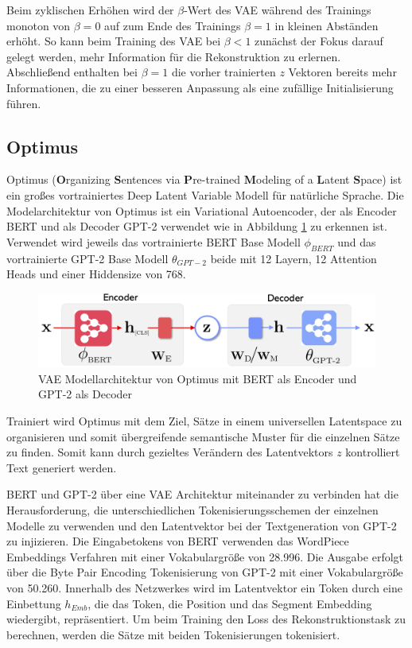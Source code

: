 Beim zyklischen Erhöhen wird der $\beta$-Wert des VAE während des Trainings monoton von $\beta=0$ auf zum Ende des Trainings $\beta=1$ in kleinen Abständen erhöht.
So kann beim Training des VAE bei $\beta<1$ zunächst der Fokus darauf gelegt werden, mehr Information für die Rekonstruktion zu erlernen. 
Abschließend enthalten bei $\beta=1$ die vorher trainierten $z$ Vektoren bereits mehr Informationen, die zu einer besseren Anpassung als eine zufällige Initialisierung führen.



\subsection{Optimus}
Optimus (\textbf{O}rganizing \textbf{S}entences via \textbf{P}re-trained \textbf{M}odeling of a \textbf{L}atent \textbf{S}pace) \citep{DBLP:journals/corr/abs-2004-04092} ist ein großes vortrainiertes Deep Latent Variable Modell für natürliche Sprache.
Die Modelarchitektur von Optimus ist ein Variational Autoencoder, der als Encoder BERT und als Decoder GPT-2 verwendet wie in Abbildung \ref{optimus_scheme_fig} zu erkennen ist. 
Verwendet wird jeweils das vortrainierte BERT Base Modell $\phi_{BERT}$ und das vortrainierte GPT-2 Base Modell $\theta_{GPT-2}$ beide mit 12 Layern, 12 Attention Heads und einer Hiddensize von 768. 
\begin{figure}[h]
    \centering
    \includegraphics[width=\textwidth]{bilder/optimus_scheme}
    \caption{VAE Modellarchitektur von Optimus mit BERT als Encoder und GPT-2 als Decoder \citep{DBLP:journals/corr/abs-2004-04092}}
    \label{optimus_scheme_fig}
\end{figure}
Trainiert wird Optimus mit dem Ziel, Sätze in einem universellen Latentspace zu organisieren und somit übergreifende semantische Muster für die einzelnen Sätze zu finden.
Somit kann durch gezieltes Verändern des Latentvektors $z$ kontrolliert Text generiert werden. %

BERT und GPT-2 über eine VAE Architektur miteinander zu verbinden hat die Herausforderung, die unterschiedlichen Tokenisierungsschemen der einzelnen Modelle zu verwenden und den Latentvektor bei der Textgeneration von GPT-2 zu injizieren. 
Die Eingabetokens von BERT verwenden das WordPiece Embeddings Verfahren \citep{wordpiece} mit einer Vokabulargröße von 28.996. 
Die Ausgabe erfolgt über die Byte Pair Encoding Tokenisierung \citep{bytepairencoding} von GPT-2 mit einer Vokabulargröße von 50.260. 
Innerhalb des Netzwerkes wird im Latentvektor ein Token durch eine Einbettung $h_{Emb}$, die das Token, die Position und das Segment Embedding wiedergibt, repräsentiert.
Um beim Training den Loss des Rekonstruktionstask zu berechnen, werden die Sätze mit beiden Tokenisierungen tokenisiert.

